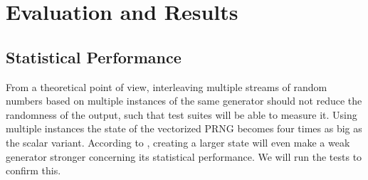 \documentclass{stdlocal}
\begin{document}
\section{Evaluation and Results} %
\label{sec:evaluation}
  \autocite{compiler-explorer,intel-intrinsics-guide,perfevent,vandevoorde2018,meyers2014}

  \subsection{Statistical Performance} %
  \label{sub:statistical_performance}
    From a theoretical point of view, interleaving multiple streams of random numbers based on multiple instances of the same generator should not reduce the randomness of the output, such that test suites will be able to measure it.
    Using multiple instances the state of the vectorized PRNG becomes four times as big as the scalar variant.
    According to \textcite{oneill-blog-toobig}, creating a larger state will even make a weak generator stronger concerning its statistical performance.
    We will run the tests to confirm this.
\end{document}
